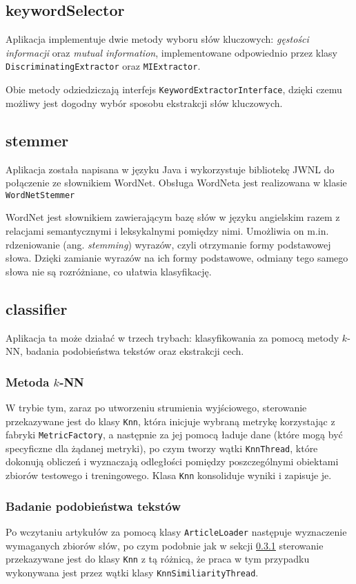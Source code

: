 \documentclass{classrep}
\begin{document}
\subsection{keywordSelector}
Aplikacja implementuje dwie metody wyboru słów kluczowych: \textit{gęstości informacji} oraz \textit{mutual information}, implementowane odpowiednio przez klasy   \verb|DiscriminatingExtractor| oraz \verb|MIExtractor|.

Obie metody odziedziczają interfejs \verb|KeywordExtractorInterface|, dzięki czemu możliwy jest dogodny wybór sposobu ekstrakcji słów kluczowych.

\subsection{stemmer}
Aplikacja została napisana w języku Java i wykorzystuje bibliotekę JWNL do połączenie ze słownikiem WordNet. Obsługa WordNeta jest realizowana w klasie \verb|WordNetStemmer|
 
WordNet jest słownikiem zawierającym bazę słów w języku angielskim razem z relacjami semantycznymi i leksykalnymi pomiędzy nimi. Umożliwia on m.in. rdzeniowanie (ang. \textit{stemming}) wyrazów, czyli otrzymanie formy podstawowej słowa. Dzięki zamianie wyrazów na ich formy podstawowe, odmiany tego samego słowa nie są rozróżniane, co ułatwia klasyfikację.

\subsection{classifier}
Aplikacja ta może działać w trzech trybach: klasyfikowania za pomocą metody $k$-NN, badania podobieństwa tekstów oraz ekstrakcji cech.

\subsubsection{Metoda $k$-NN}
\label{sec:impl_knn}
W trybie tym, zaraz po utworzeniu strumienia wyjściowego, sterowanie przekazywane jest do klasy \verb|Knn|, która inicjuje wybraną metrykę korzystając z fabryki \verb|MetricFactory|, a następnie za jej pomocą ładuje dane (które mogą być specyficzne dla żądanej metryki), po czym tworzy wątki \verb|KnnThread|, które dokonują obliczeń i wyznaczają odległości pomiędzy poszczególnymi obiektami zbiorów testowego i treningowego. Klasa \verb|Knn| konsoliduje wyniki i zapisuje je.

\subsubsection{Badanie podobieństwa tekstów}
Po wczytaniu artykułów za pomocą klasy \verb|ArticleLoader| następuje wyznaczenie wymaganych zbiorów słów, po czym podobnie jak w sekcji \ref{sec:impl_knn} sterowanie przekazywane jest do klasy \verb|Knn| z tą różnicą, że praca w tym przypadku wykonywana jest przez wątki klasy \verb|KnnSimiliarityThread|.
\end{document}
